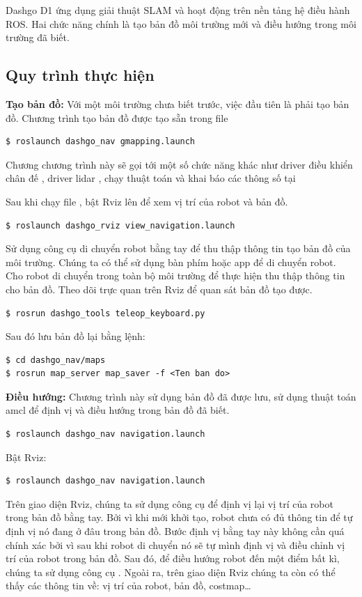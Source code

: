 Dashgo D1 ứng dụng giải thuật SLAM và hoạt động trên nền tảng hệ điều hành ROS.
Hai chức năng chính là tạo bản đồ môi trường mới và điều hướng trong môi trường đã biết.

\subsection{Quy trình thực hiện}

\textbf{Tạo bản đồ:} Với một môi trường chưa biết trước, việc đầu tiên là phải tạo bản đồ.
Chương trình tạo bản đồ được tạo sẵn trong file 

\begin{lstlisting}
$ roslaunch dashgo_nav gmapping.launch
\end{lstlisting}

Chương chương trình này sẽ gọi tới một số chức năng khác như driver điều khiển chân đế , driver lidar , chạy thuật toán và khai báo các thông số tại 

Sau khi chạy file , bật Rviz lên để xem vị trí của robot và bản đồ.
\begin{lstlisting}
$ roslaunch dashgo_rviz view_navigation.launch
\end{lstlisting}


Sử dụng công cụ di chuyển robot bằng tay để thu thập thông tin tạo bản đồ của môi trường. Chúng ta có thể sử dụng bàn phím hoặc app để di chuyển robot. Cho robot di chuyển trong toàn bộ môi trường để thực hiện thu thập thông tin cho bản đồ. Theo dõi trực quan trên Rviz để quan sát bản đồ tạo được.
\begin{lstlisting}
$ rosrun dashgo_tools teleop_keyboard.py
\end{lstlisting}

Sau đó lưu bản đồ lại bằng lệnh:
\begin{lstlisting}
$ cd dashgo_nav/maps
$ rosrun map_server map_saver -f <Ten ban do>
\end{lstlisting}

\textbf{Điều hướng:} Chương trình này sử dụng bản đồ đã được lưu, sử dụng thuật toán amcl để định vị và điều hướng trong bản đồ đã biết.
\begin{lstlisting}
$ roslaunch dashgo_nav navigation.launch
\end{lstlisting}

Bật Rviz:
\begin{lstlisting}
$ roslaunch dashgo_nav navigation.launch
\end{lstlisting}
Trên giao diện Rviz, chúng ta sử dụng công cụ  để định vị lại vị trí của robot trong bản đồ bằng tay.
Bởi vì khi mới khởi tạo, robot chưa có đủ thông tin để tự định vị nó đang ở đâu trong bản đồ. Bước định vị bằng tay này không cần quá chính xác bởi vì sau khi robot di chuyển nó sẽ tự mình định vị và điều chỉnh vị trí của robot trong bản đồ. Sau đó, để điều hướng robot đến một điểm bất kì, chúng ta sử dụng công cụ . Ngoài ra, trên giao diện Rviz chúng ta còn có thể thấy các thông tin về: vị trí của robot, bản đồ, costmap\dots


